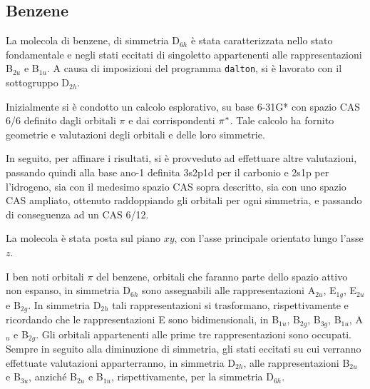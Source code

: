 \subsection{Benzene}

La molecola di benzene, di simmetria D$_{6h}$ \`e stata caratterizzata nello
stato fondamentale e negli stati eccitati di singoletto appartenenti alle rappresentazioni
B$_{2u}$ e B$_{1u}$. A causa di imposizioni del programma \texttt{dalton},
si \`e lavorato con il sottogruppo D$_{2h}$.

Inizialmente si \`e condotto un calcolo esplorativo, su base 6-31G* con spazio
CAS 6/6 definito dagli orbitali $\pi$ e dai corrispondenti $\pi^{*}$. Tale
calcolo ha fornito geometrie e valutazioni degli orbitali e delle loro
simmetrie.

In seguito, per affinare i risultati, si \`e provveduto ad effettuare altre
valutazioni, passando quindi alla base ano-1 definita 3s2p1d per il carbonio
e 2s1p per l'idrogeno, sia con il medesimo spazio CAS sopra descritto, sia
con uno spazio CAS ampliato, ottenuto raddoppiando gli orbitali per ogni
simmetria, e passando di conseguenza ad un CAS 6/12.

La molecola \`e stata posta sul piano $xy$, con l'asse principale orientato
lungo l'asse $z$.

I ben noti orbitali $\pi$ del benzene, orbitali che faranno parte dello
spazio attivo non espanso, in simmetria D$_{6h}$ sono assegnabili alle
rappresentazioni A$_{2u}$, E$_{1g}$, E$_{2u}$ e B$_{2g}$. In simmetria
D$_{2h}$ tali rappresentazioni si trasformano, rispettivamente e ricordando
che le rappresentazioni E sono bidimensionali, in B$_{1u}$, B$_{2g}$,
B$_{3g}$, B$_{1u}$, A$_{u}$ e B$_{2g}$. Gli orbitali appartenenti alle prime
tre rappresentazioni sono occupati.
Sempre in seguito alla diminuzione di simmetria, gli stati eccitati su cui
verranno effettuate valutazioni apparterranno, in simmetria D$_{2h}$,
alle rappresentazioni B$_{2u}$ e B$_{3u}$, anzich\'e B$_{2u}$ e B$_{1u}$,
rispettivamente, per la simmetria D$_{6h}$.

